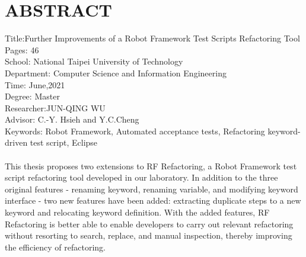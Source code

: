 \chapter*{ABSTRACT}


\noindent
Title:Further Improvements of a Robot Framework Test Scripts Refactoring Tool\\
Pages: 46\\
School: National Taipei University of Technology\\
Department: Computer Science and Information Engineering\\
Time: June,2021\\
Degree: Master\\
Researcher:JUN-QING WU\\
Advisor: C.-Y. Hsieh and Y.C.Cheng
\hspace*{\fill}\\
Keywords: Robot Framework, Automated acceptance tests, Refactoring keyword-driven test script, Eclipse\\
\hspace*{\fill}\\
\indent
This thesis proposes two extensions to RF Refactoring, a Robot Framework test script refactoring tool developed in our laboratory. In addition to the three original features - renaming keyword, renaming variable, and modifying keyword interface - two new features have been added: extracting duplicate steps to a new keyword and relocating keyword definition. With the added features, RF Refactoring is better able to enable developers to carry out relevant refactoring without resorting to search, replace, and manual inspection, thereby improving the efficiency of refactoring.